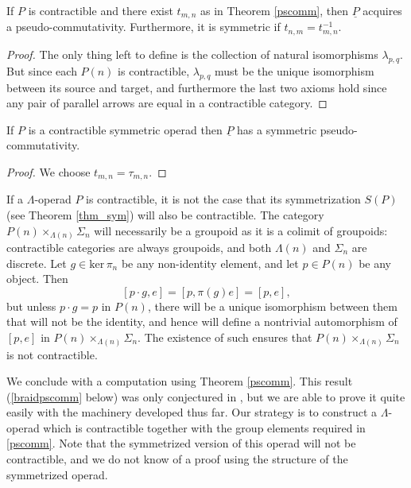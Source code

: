\documentclass{amsbook} %
\numberwithin{section}{chapter}
\begin{document}
\begin{cor}
If $P$ is contractible and there exist $t_{m,n}$ as in Theorem \ref{pscomm}, then $\underline{P}$ acquires a pseudo-commutativity. Furthermore, it is symmetric if $t_{n,m} = t_{m,n}^{-1}$.
\end{cor}
\begin{proof}
The only thing left to define is the collection of natural isomorphisms $\lambda_{p,q}$.  But since each $P(n)$ is contractible, $\lambda_{p,q}$ must be the unique isomorphism between its source and target, and furthermore the last two axioms hold since any pair of parallel arrows are equal in a contractible category.
\end{proof}

\begin{cor}
If $P$ is a contractible symmetric operad then $\underline{P}$ has a symmetric pseudo-commutativity.
\end{cor}
\begin{proof}
We choose $t_{m,n} = \tau_{m,n}$.
\end{proof}

\begin{rem}
If a $\Lambda$-operad $P$ is contractible, it is not the case that its symmetrization $S(P)$ (see Theorem \ref{thm_sym}) will also be contractible.  The category $P(n) \times_{\Lambda(n)} \Sigma_{n}$ will necessarily be a groupoid as it is a colimit of groupoids: contractible categories are always groupoids, and both $\Lambda(n)$ and $\Sigma_{n}$ are discrete.  Let $g \in \textrm{ker} \, \pi_{n}$ be any non-identity element, and let $p \in P(n)$ be any object.  Then
\[
[p \cdot g, e] = [p, \pi(g)e] = [p,e],
\]
but unless $p\cdot g = p$ in $P(n)$, there will be a unique isomorphism between them that will not be the identity, and hence will define a nontrivial automorphism of $[p,e]$ in  $P(n) \times_{\Lambda(n)} \Sigma_{n}$.  The existence of such ensures that $P(n) \times_{\Lambda(n)} \Sigma_{n}$ is not contractible.
\end{rem}



We conclude with a computation using Theorem \ref{pscomm}.  This result (\ref{braidpscomm} below) was only conjectured in \cite{HP}, but we are able to prove it quite easily with the machinery developed thus far.  Our strategy is to construct a $\Lambda$-operad which is contractible together with the group elements required in \ref{pscomm}.  Note that the symmetrized version of this operad will not be contractible, and we do not know of a proof using the structure of the symmetrized operad.
\end{document}
